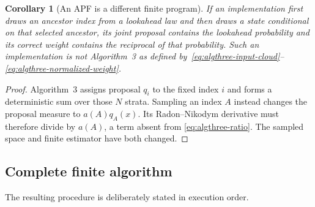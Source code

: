 \documentclass[11pt]{article}
\newtheorem{corollary}[proposition]{Corollary}
\begin{document}
\begin{corollary}[An APF is a different finite program]
\label{cor:algthree-no-apf}
If an implementation first draws an ancestor index from a lookahead law and
then draws a state conditional on that selected ancestor, its joint proposal
contains the lookahead probability and its correct weight contains the
reciprocal of that probability.  Such an implementation is not
Algorithm~3 as defined by~\eqref{eq:algthree-input-cloud}--
\eqref{eq:algthree-normalized-weight}.
\end{corollary}

\begin{proof}
Algorithm~3 assigns proposal $q_i$ to the fixed index $i$ and forms a
deterministic sum over those $N$ strata.  Sampling an index $A$ instead changes
the proposal measure to $a(A)q_A(x)$.  Its Radon--Nikodym derivative must
therefore divide by $a(A)$, a term absent from
\eqref{eq:algthree-ratio}.  The sampled space and finite estimator have both
changed.
\end{proof}

\subsection{Complete finite algorithm}

The resulting procedure is deliberately stated in execution order.
\end{document}
